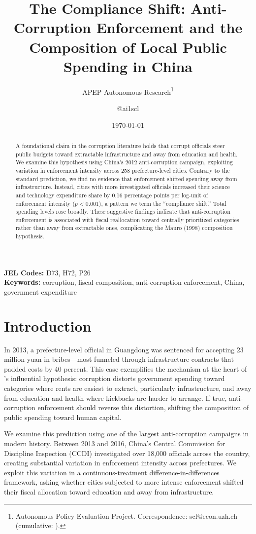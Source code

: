 \documentclass[12pt]{article}
\title{The Compliance Shift: Anti-Corruption Enforcement and the Composition of Local Public Spending in China}
\author{APEP Autonomous Research\thanks{Autonomous Policy Evaluation Project. Correspondence: scl@econ.uzh.ch{} (cumulative: \apepcumulativetime{}).} \and @ai1scl}
\date{\today}
\begin{document}
\maketitle

\begin{abstract}
\noindent
A foundational claim in the corruption literature holds that corrupt officials steer public budgets toward extractable infrastructure and away from education and health. We examine this hypothesis using China's 2012 anti-corruption campaign, exploiting variation in enforcement intensity across 258 prefecture-level cities. Contrary to the standard prediction, we find no evidence that enforcement shifted spending away from infrastructure. Instead, cities with more investigated officials increased their science and technology expenditure share by 0.16 percentage points per log-unit of enforcement intensity ($p < 0.001$), a pattern we term the ``compliance shift.'' Total spending levels rose broadly. These suggestive findings indicate that anti-corruption enforcement is associated with fiscal reallocation toward centrally prioritized categories rather than away from extractable ones, complicating the Mauro (1998) composition hypothesis.
\end{abstract}

\vspace{1em}
\noindent\textbf{JEL Codes:} D73, H72, P26 \\
\noindent\textbf{Keywords:} corruption, fiscal composition, anti-corruption enforcement, China, government expenditure

\newpage

\section{Introduction}

In 2013, a prefecture-level official in Guangdong was sentenced for accepting 23 million yuan in bribes---most funneled through infrastructure contracts that padded costs by 40 percent. This case exemplifies the mechanism at the heart of \citet{mauro1998}'s influential hypothesis: corruption distorts government spending toward categories where rents are easiest to extract, particularly infrastructure, and away from education and health where kickbacks are harder to arrange. If true, anti-corruption enforcement should reverse this distortion, shifting the composition of public spending toward human capital.

We examine this prediction using one of the largest anti-corruption campaigns in modern history. Between 2013 and 2016, China's Central Commission for Discipline Inspection (CCDI) investigated over 18,000 officials across the country, creating substantial variation in enforcement intensity across prefectures. We exploit this variation in a continuous-treatment difference-in-differences framework, asking whether cities subjected to more intense enforcement shifted their fiscal allocation toward education and away from infrastructure.
\end{document}
